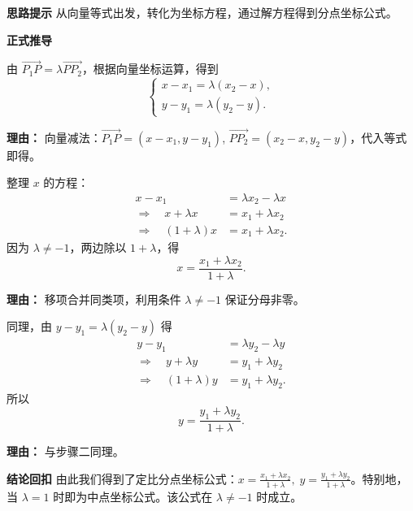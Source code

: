 \begin{proofbox}
	\textbf{\textcolor{CProof}{思路提示}}
	从向量等式出发，转化为坐标方程，通过解方程得到分点坐标公式。

	\medskip
	\textbf{\textcolor{CProof}{正式推导}}
	\begin{description}[style=nextline, leftmargin=2.8em, labelsep=0.5em, itemsep=0.55em]
		\item[\textbf{步骤一（向量坐标化）：}]
			由 $\overrightarrow{P_1P} = \lambda \overrightarrow{PP_2}$，根据向量坐标运算，得到
			\[
				\begin{cases}
					x-x_1 = \lambda (x_2-x),\\ y-y_1 = \lambda (y_2-y).
			\end{cases}
			\]
			\par\textbf{理由：} 向量减法：$\overrightarrow{P_1P}=(x-x_1,y-y_1)$, $\overrightarrow{PP_2}=(x_2-x,y_2-y)$，代入等式即得。
		\item[\textbf{步骤二（求横坐标）：}]
			整理 $x$ 的方程：
			\[
				\begin{aligned}
					x - x_1 &= \lambda x_2 - \lambda x \\ \Rightarrow \quad x + \lambda x &= x_1 + \lambda x_2 \\ \Rightarrow \quad (1+\lambda)x &= x_1 + \lambda x_2 .
			\end{aligned}
			\]
			因为 $\lambda\neq -1$，两边除以 $1+\lambda$，得
			\[
				x = \frac{x_1+\lambda x_2}{1+\lambda}.
			\]
			\par\textbf{理由：} 移项合并同类项，利用条件 $\lambda\neq -1$ 保证分母非零。
		\item[\textbf{步骤三（求纵坐标）：}]
			同理，由 $y-y_1 = \lambda (y_2-y)$ 得
			\[
				\begin{aligned}
					y - y_1 &= \lambda y_2 - \lambda y \\ \Rightarrow \quad y + \lambda y &= y_1 + \lambda y_2 \\ \Rightarrow \quad (1+\lambda)y &= y_1 + \lambda y_2 .
			\end{aligned}
			\]
			所以
			\[
				y = \frac{y_1+\lambda y_2}{1+\lambda}.
			\]
			\par\textbf{理由：} 与步骤二同理。
	\end{description}

	\medskip
	\textbf{\textcolor{CProof}{结论回扣}}
	由此我们得到了定比分点坐标公式：$x = \frac{x_1+\lambda x_2}{1+\lambda},\; y = \frac{y_1+\lambda y_2}{1+\lambda}$。特别地，当 $\lambda=1$ 时即为中点坐标公式。该公式在 $\lambda\neq -1$ 时成立。
\end{proofbox}
